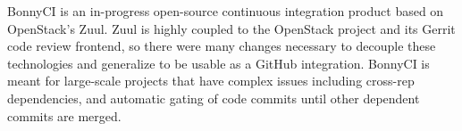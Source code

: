 {
  BonnyCI is an in-progress open-source continuous integration product based on OpenStack's Zuul. Zuul is highly coupled to the OpenStack project and its Gerrit code review frontend, so there were many changes necessary to decouple these technologies and generalize to be usable as a GitHub integration. BonnyCI is meant for large-scale projects that have complex issues including cross-rep dependencies, and automatic gating of code commits until other dependent commits are merged.}
